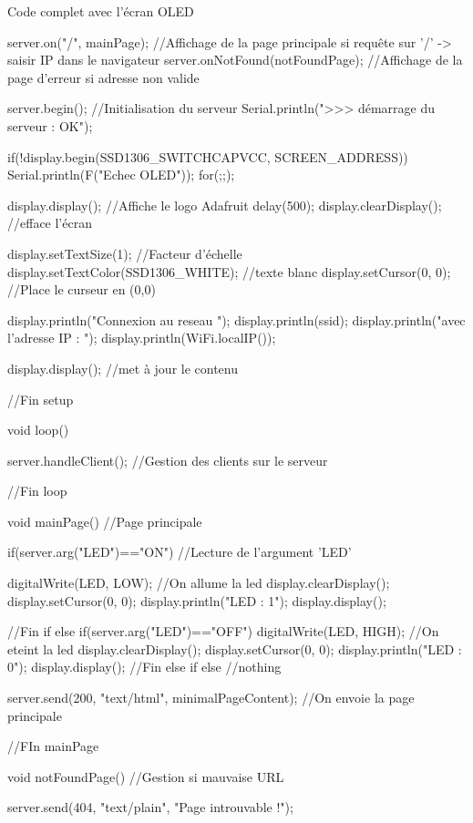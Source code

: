 \begin{Cpp}{Code complet avec l'écran OLED}
{      server.on("/", mainPage);           //Affichage de la page principale si requête sur '/' -> saisir IP dans le navigateur
      server.onNotFound(notFoundPage);    //Affichage de la page d'erreur si adresse non valide
    
      server.begin();                     //Initialisation du serveur
      Serial.println(">>> démarrage du serveur : OK");
    
      if(!display.begin(SSD1306_SWITCHCAPVCC, SCREEN_ADDRESS)) {
        Serial.println(F("Echec OLED"));
        for(;;); 
      }
    
      display.display(); //Affiche le logo Adafruit
      delay(500); 
      display.clearDisplay(); //efface l'écran
    
      display.setTextSize(1);               //Facteur d'échelle
      display.setTextColor(SSD1306_WHITE);  //texte blanc
      display.setCursor(0, 0);              //Place le curseur en (0,0)
      
      display.println("Connexion au reseau ");
      display.println(ssid);
      display.println("avec l'adresse IP : ");
      display.println(WiFi.localIP());
      
      display.display();   //met à jour le contenu
      
    }//Fin setup
    
    void loop() 
    {
      
      server.handleClient(); //Gestion des clients sur le serveur
      
    }//Fin loop
    
    
    void mainPage() //Page principale
    { 
    
     if(server.arg("LED")=="ON") //Lecture de l'argument 'LED'
     {
          digitalWrite(LED, LOW); //On allume la led
          display.clearDisplay();
          display.setCursor(0, 0);  
          display.println("LED : 1");
          display.display();
          
     }//Fin if
     else if(server.arg("LED")=="OFF")
     {
        digitalWrite(LED, HIGH);   //On eteint la led
        display.clearDisplay();
        display.setCursor(0, 0);  
        display.println("LED : 0");
        display.display();
     }//Fin else if
     else {
      //nothing
     }
    
     server.send(200, "text/html", minimalPageContent); //On envoie la page principale
      
    }//FIn mainPage
    
    
    void notFoundPage()  //Gestion si mauvaise URL
    {
      server.send(404, "text/plain", "Page introuvable !\n\n");
      
    }
    

\end{Cpp}
